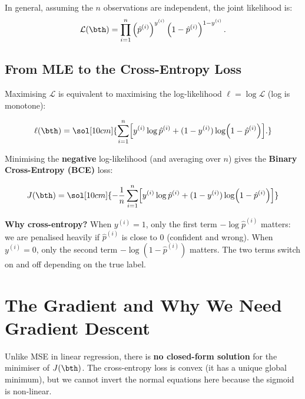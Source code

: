 \documentclass[12pt, a4paper]{article}
\begin{document}
In general, assuming the $n$ observations are independent, the joint
likelihood is:
\[
  \mathcal{L}(\bth)
  = \prod_{i=1}^{n}
  \left(\hat{p}^{(i)}\right)^{y^{(i)}}
  \left(1 - \hat{p}^{(i)}\right)^{1 - y^{(i)}}.
\]

\subsection{From MLE to the Cross-Entropy Loss}

Maximising $\mathcal{L}$ is equivalent to maximising the log-likelihood
$\ell = \log \mathcal{L}$ (log is monotone):

\[
  \ell(\bth)
  = \sol[10cm]{\sum_{i=1}^{n}
    \Bigl[y^{(i)} \log \hat{p}^{(i)}
      + (1 - y^{(i)}) \log\!\left(1 - \hat{p}^{(i)}\right)\Bigr].}
\]

Minimising the \textbf{negative} log-likelihood (and averaging over $n$) gives
the \textbf{Binary Cross-Entropy (BCE)} loss:

\begin{resultbox}
  \[
    J(\bth)
    = \sol[10cm]{-\frac{1}{n}\sum_{i=1}^{n}
      \Bigl[y^{(i)} \log \hat{p}^{(i)}
        + (1 - y^{(i)}) \log\!\left(1 - \hat{p}^{(i)}\right)\Bigr]}
  \]
\end{resultbox}

\begin{notebox}
  \textbf{Why cross-entropy?}
  When $y^{(i)} = 1$, only the first term $-\log\hat{p}^{(i)}$ matters:
  we are penalised heavily if $\hat{p}^{(i)}$ is close to 0 (confident and
  wrong).  When $y^{(i)} = 0$, only the second term $-\log(1-\hat{p}^{(i)})$
  matters.  The two terms switch on and off depending on the true label.
\end{notebox}



\section{The Gradient and Why We Need Gradient Descent}

Unlike MSE in linear regression, there is \textbf{no closed-form solution}
for the minimiser of $J(\bth)$.  The cross-entropy loss is convex (it has a
unique global minimum), but we cannot invert the normal equations here because
the sigmoid is non-linear.
\end{document}
